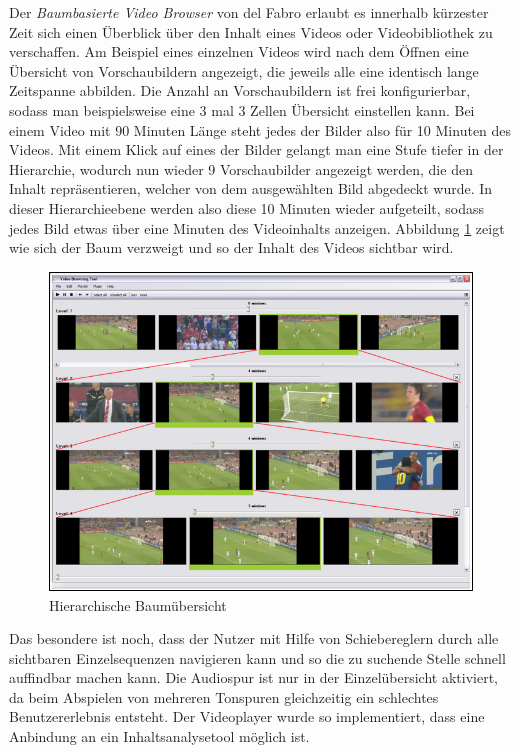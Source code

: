 \documentclass[11pt,a4paper]{report}
\begin{document}
Der \emph{Baumbasierte Video Browser} von del Fabro \cite{del2010instant} erlaubt es innerhalb kürzester Zeit sich einen Überblick über den Inhalt eines Videos oder Videobibliothek zu verschaffen. Am Beispiel eines einzelnen Videos wird nach dem Öffnen eine Übersicht von Vorschaubildern angezeigt, die jeweils alle eine identisch lange Zeitspanne abbilden. Die Anzahl an Vorschaubildern ist frei konfigurierbar, sodass man beispielsweise eine 3 mal 3 Zellen Übersicht einstellen kann. Bei einem Video mit 90 Minuten Länge steht jedes der Bilder also für 10 Minuten des Videos. Mit einem Klick auf eines der Bilder gelangt man eine Stufe tiefer in der Hierarchie, wodurch nun wieder 9 Vorschaubilder angezeigt werden, die den Inhalt repräsentieren, welcher von dem ausgewählten Bild abgedeckt wurde. In dieser Hierarchieebene werden also diese 10 Minuten wieder aufgeteilt, sodass jedes Bild etwas über eine Minuten des Videoinhalts anzeigen. Abbildung \ref{baum_browser} zeigt wie sich der Baum verzweigt und so der Inhalt des Videos sichtbar wird.
\begin{figure}[h]
\begin{center}
\includegraphics[scale=1.1]{./images/8.png}
\caption{Hierarchische Baumübersicht \cite{del2010instant}}
\label{baum_browser}
\end{center}
\end{figure}
Das besondere ist noch, dass der Nutzer mit Hilfe von Schiebereglern durch alle sichtbaren Einzelsequenzen navigieren kann und so die zu suchende Stelle schnell auffindbar machen kann. Die Audiospur ist nur in der Einzelübersicht aktiviert, da beim Abspielen von mehreren Tonspuren gleichzeitig ein schlechtes Benutzererlebnis entsteht. Der Videoplayer wurde so implementiert, dass eine Anbindung an ein Inhaltsanalysetool möglich ist.
\end{document}
